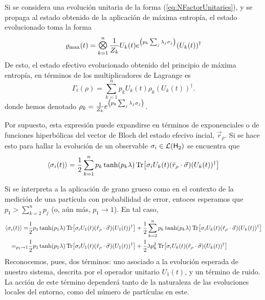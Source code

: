 Si se considera una evolución unitaria de la forma (\ref{eq:NFactorUnitaries}), y se propaga al estado obtenido de la aplicación de máxima entropía, el estado evolucionado toma la forma
\begin{equation*}
    \varrho_{\max}(t)=\Motimes_{k=1}^{n}\frac{1}{Z_{k}}U_{k}(t) e^{\qty(p_{k}\sum_{j}\lambda_{j}\pauli{j})} (U_{k}(t))^{\dag}
\end{equation*}
De esto, el estado efectivo evolucionado obtenido del principio de máxima entropía, en términos de los multiplicadores de Lagrange es
\begin{equation}\label{eq:SeparableEvolution}
    \Gamma_{t}(\rho)=\sum_{k=1}^{n}p_{k} U_{k}(t) \rho_{k} (U_{k}(t))^{\dag}.
\end{equation}
donde hemos denotado $\rho_{k}=\frac{1}{Z_{k}}e^{\qty(p_{k}\sum_{j}\lambda_{j}\sigma_{j})}$. 

Por supuesto, esta expresión puede expandirse en términos de exponenciales o de funciones hiperbólicas del vector de Bloch del estado efecivo incial, $\vec{r}_{\rho}$. Si se hace esto para hallar la evolución de un observable $\sigma_{i}\in\mathcal{L}({\sf H}_{2})$ se encuentra que
\begin{equation}\label{eq:SeparableEvolutionExpVal}
    \expval{\sigma_{i}(t)}=\frac{1}{2}\sum_{k=1}^{n}p_{k}\tanh(p_{k}\lambda)\Tr[\sigma_{i}U_{k}(t) (\hat{r}_{\rho}\cdot\vec{\sigma}) (U_{k}(t))^{\dag}]
\end{equation}

Si se interpreta a la aplicación de grano grueso como en el contexto de la medición de una partícula con probabilidad de error, entoces esperamos que  $p_{1}>\sum_{k=2}^{n}p_{j}$ (o, aún más, $p_{1}\rightarrow 1$). En tal caso, 
\begin{align*}
    \expval{\sigma_{i}(t)}=&\frac{1}{2}p_{1}\tanh(p_{1}\lambda)\Tr[\sigma_{i}U_{1}(t) (\hat{r}_{\rho}\cdot\vec{\sigma}) (U_{1}(t))^{\dag}]+\frac{1}{2}\sum_{k=2}^{n}p_{k}\tanh(p_{k}\lambda)\Tr[\sigma_{i}U_{k}(t) (\hat{r}_{\rho}\cdot\vec{\sigma}) (U_{k}(t))^{\dag}]\\
    =_{p_{1}\rightarrow 1}&\frac{1}{2}p_{1}\tanh(p_{1}\lambda)\Tr[\sigma_{i}U_{1}(t) (\hat{r}_{\rho}\cdot\vec{\sigma}) (U_{1}(t))^{\dag}]+\frac{1}{2}\lambda p_{k}^{2}\Tr[\sigma_{i}U_{k}(t) (\hat{r}_{\rho}\cdot\vec{\sigma}) (U_{k}(t))^{\dag}]
\end{align*}
Reconocemos, pues, dos términos: uno asociado a la evolución esperada de nuestro sistema, descrita por el operador unitario $U_{1}(t)$, y un término de ruido. La acción de este término dependerá tanto de la naturaleza de las evoluciones locales del entorno, como del número de partículas en este.


